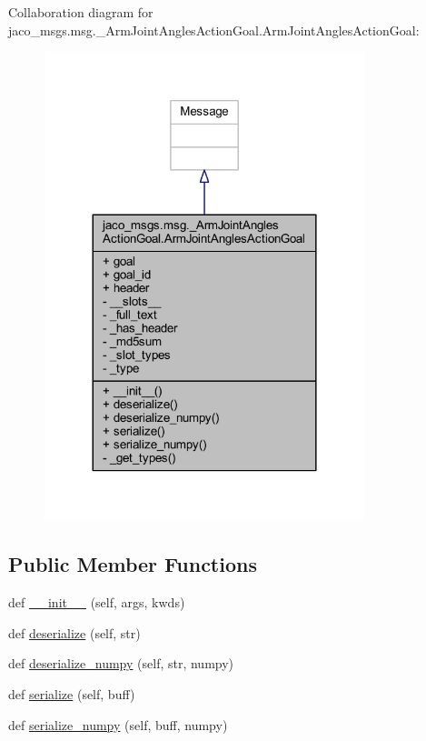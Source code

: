 Collaboration diagram for jaco\+\_\+msgs.\+msg.\+\_\+\+Arm\+Joint\+Angles\+Action\+Goal.\+Arm\+Joint\+Angles\+Action\+Goal\+:
\nopagebreak
\begin{figure}[H]
\begin{center}
\leavevmode
\includegraphics[width=264pt]{d8/de5/classjaco__msgs_1_1msg_1_1__ArmJointAnglesActionGoal_1_1ArmJointAnglesActionGoal__coll__graph}
\end{center}
\end{figure}
\subsection*{Public Member Functions}
\begin{DoxyCompactItemize}
\item 
def \hyperlink{classjaco__msgs_1_1msg_1_1__ArmJointAnglesActionGoal_1_1ArmJointAnglesActionGoal_a0d89515fa2121cd0a57ea846643b3987}{\+\_\+\+\_\+init\+\_\+\+\_\+} (self, args, kwds)
\item 
def \hyperlink{classjaco__msgs_1_1msg_1_1__ArmJointAnglesActionGoal_1_1ArmJointAnglesActionGoal_a2c0e8d441ed95ea66a3cea70f5756f91}{deserialize} (self, str)
\item 
def \hyperlink{classjaco__msgs_1_1msg_1_1__ArmJointAnglesActionGoal_1_1ArmJointAnglesActionGoal_a51d2b141fbda65707aa052f65f8ec37e}{deserialize\+\_\+numpy} (self, str, numpy)
\item 
def \hyperlink{classjaco__msgs_1_1msg_1_1__ArmJointAnglesActionGoal_1_1ArmJointAnglesActionGoal_ac733529514e55c4ea7cc9037130724eb}{serialize} (self, buff)
\item 
def \hyperlink{classjaco__msgs_1_1msg_1_1__ArmJointAnglesActionGoal_1_1ArmJointAnglesActionGoal_a5088fffd6d180dd855b21240d11d05fd}{serialize\+\_\+numpy} (self, buff, numpy)
\end{DoxyCompactItemize}
